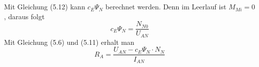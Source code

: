 \chapter{}\label{ex:aufg3}
%
\section{}\label{sec:aufg3a}
Mit Gleichung (5.12) kann $c_E \Psi_N$ berechnet werden. Denn im Leerlauf ist $M_{Mi} = 0$, daraus folgt
\begin{equation}
c_E \Psi_N = \frac{N_{N0}}{U_{AN}}
\end{equation} 
Mit Gleichung (5.6) und (5.11) erhalt man
\begin{equation}
R_A = \frac{U_{AN} - c_E \Psi_N \cdot N_N}{I_{AN}}
\end{equation} 

\section{}\label{sec:aufg3b}
%
\clearpage
